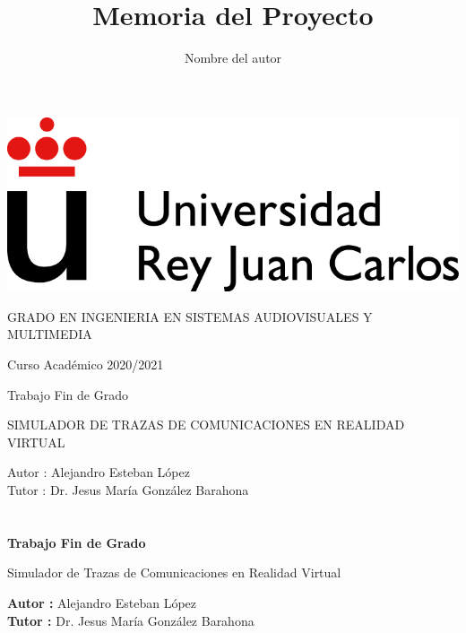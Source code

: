 \documentclass[a4paper, 12pt]{book}
\title{Memoria del Proyecto}
\author{Nombre del autor}
\begin{document}
\renewcommand{\refname}{Bibliografía}  %


\begin{titlepage}
\begin{center}
\includegraphics[scale=0.8]{img/URJ_logo_Color_POS.png}

\vspace{1.75cm}

\Large
GRADO EN INGENIERIA EN SISTEMAS AUDIOVISUALES Y MULTIMEDIA 

\vspace{0.4cm}

\large
Curso Académico 2020/2021

\vspace{0.8cm}

Trabajo Fin de Grado

\vspace{2.5cm}

\LARGE
SIMULADOR DE TRAZAS DE COMUNICACIONES EN REALIDAD VIRTUAL

\vspace{4cm}

\large
Autor : Alejandro Esteban López \\
Tutor : Dr. Jesus María González Barahona
\end{center}
\end{titlepage}

\newpage
\mbox{}
\thispagestyle{empty} %


\clearpage
{}
\chapter*{}

\vspace{-4cm}
\begin{center}
\LARGE
\textbf{Trabajo Fin de Grado}

\vspace{1cm}
\large
Simulador de Trazas de Comunicaciones en Realidad Virtual

\vspace{1cm}
\large
\textbf{Autor :} Alejandro Esteban López \\
\textbf{Tutor :} Dr. Jesus María González Barahona

\end{center}
\end{document}
